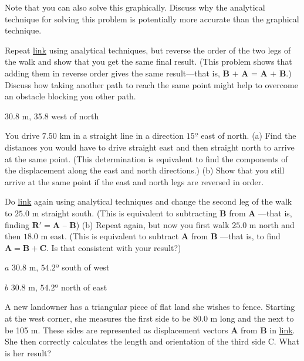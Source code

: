 \documentclass[
]{book}
\newenvironment{problems-exercises}{}{}
\begin{document}
\begin{problems-exercises}
Note that you can also solve this graphically. Discuss why the
analytical technique for solving this problem is potentially more
accurate than the graphical technique.

\hypertarget{eip-430}{}
\leavevmode\hypertarget{eip-400}{}%
Repeat \protect\hyperlink{eip-287}{link} using analytical
techniques, but reverse the order of the two legs of the walk and show
that you get the same final result. (This problem shows that adding them
in reverse order gives the same result---that is,
\(\textbf{B\ +\ A\ =\ A\ +\ B}\).) Discuss how taking another path to
reach the same point might help to overcome an obstacle blocking you
other path.

\leavevmode\hypertarget{eip-24}{}%
30.8 m, 35.8 west of north

\hypertarget{fs-id1862376}{}
\leavevmode\hypertarget{fs-id1862377}{}%
You drive \({7\text{.}\text{50\ km}}{}\) in a straight line in a direction
\(15º\) east of north. (a) Find the distances you would have to drive
straight east and then straight north to arrive at the same point. (This
determination is equivalent to find the components of the displacement
along the east and north directions.) (b) Show that you still arrive at
the same point if the east and north legs are reversed in order.

\hypertarget{fs-id1629683}{}
\leavevmode\hypertarget{fs-id1629684}{}%
Do \protect\hyperlink{eip-287}{link} again using analytical
techniques and change the second leg of the walk to \(\text{25.0\ m}{}\)
straight south. (This is equivalent to subtracting \(\mathbf{B}{}\) from
\(\mathbf{A}{}\) ---that is, finding
\({\textbf{R}\prime = \textbf{A\ –\ B}}{}\)) (b) Repeat again, but now you
first walk \({\text{25}\text{.}\text{0\ m}}{}\) north and then
\({\text{18}\text{.}\text{0\ m}}{}\) east. (This is equivalent to subtract
\(\mathbf{A}{}\) from \(\mathbf{B}{}\) ---that is, to find
\({\mathbf{A} = {\mathbf{B} + \mathbf{C}}}{}\). Is that consistent with
your result?)

\leavevmode\hypertarget{fs-id1822911}{}%
\(a\) \({\text{30}\text{.}\text{8\ m}}{}\), \({\text{54}\text{.}2º}{}\)
south of west

\(b\) \({\text{30}\text{.}\text{8\ m}}{}\), \({\text{54}\text{.}2º}{}\)
north of east

\hypertarget{fs-id1956316}{}
\leavevmode\hypertarget{fs-id1956317}{}%
A new landowner has a triangular piece of flat land she wishes to fence.
Starting at the west corner, she measures the first side to be 80.0 m
long and the next to be 105 m. These sides are represented as
displacement vectors \(\mathbf{A}{}\) from \(\mathbf{B}{}\) in
\protect\hyperlink{eip-id3165265}{link}. She then correctly
calculates the length and orientation of the third side \(\text{C}{}\).
What is her result?


\end{problems-exercises}
\end{document}
